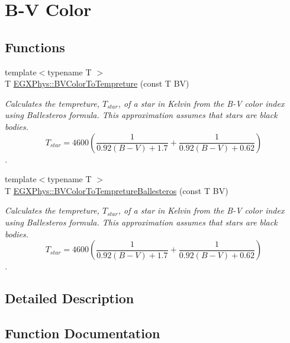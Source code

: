 \hypertarget{group___e_g_x_phys-_b-_v_color}{}\section{B-\/V Color}
\label{group___e_g_x_phys-_b-_v_color}
\subsection*{Functions}
\begin{DoxyCompactItemize}
\item 
{\footnotesize template$<$typename T $>$ }\\T \mbox{\hyperlink{group___e_g_x_phys-_b-_v_color_gad251a8c25285f5817e307c35c3ec971a}{E\+G\+X\+Phys\+::\+B\+V\+Color\+To\+Tempreture}} (const T BV)
\begin{DoxyCompactList}\small\item\em Calculates the tempreture, $T_{star}$, of a star in Kelvin from the B-\/V color index using Ballesteros\textquotesingle{} formula. This approximation assumes that stars are black bodies. \[T_{star}=4600 \left ( \frac{1}{0.92 (B-V)+ 1.7} + \frac{1}{0.92 (B-V) + 0.62} \right )\]. \end{DoxyCompactList}\item 
{\footnotesize template$<$typename T $>$ }\\T \mbox{\hyperlink{group___e_g_x_phys-_b-_v_color_ga0e553143a3bb121c3ae50ca96c502140}{E\+G\+X\+Phys\+::\+B\+V\+Color\+To\+Tempreture\+Ballesteros}} (const T BV)
\begin{DoxyCompactList}\small\item\em Calculates the tempreture, $T_{star}$, of a star in Kelvin from the B-\/V color index using Ballesteros\textquotesingle{} formula. This approximation assumes that stars are black bodies. \[T_{star}=4600 \left ( \frac{1}{0.92 (B-V)+ 1.7} + \frac{1}{0.92 (B-V) + 0.62} \right )\]. \end{DoxyCompactList}\end{DoxyCompactItemize}


\subsection{Detailed Description}


\subsection{Function Documentation}
\mbox{\label{group___e_g_x_phys-_b-_v_color_gad251a8c25285f5817e307c35c3ec971a}} 
